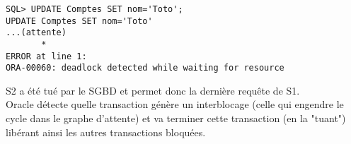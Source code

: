 \documentclass{article}
\begin{document}
\subsubsection*{}

\begin{lstlisting}
SQL> UPDATE Comptes SET nom='Toto';
UPDATE Comptes SET nom='Toto'
...(attente)
       *
ERROR at line 1:
ORA-00060: deadlock detected while waiting for resource
\end{lstlisting}

S2 a été tué par le SGBD et permet donc la dernière requête de S1. \\

Oracle détecte quelle transaction génère un interblocage (celle qui engendre le cycle dans le graphe d'attente) et va terminer cette transaction (en la "tuant") libérant ainsi les autres transactions bloquées. 
\end{document}
